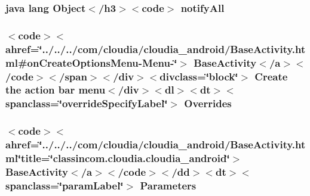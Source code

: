 \hypertarget{_sensor_overview_activity_8html_a1279357e6e09e33e75b55eb05fdb6436}{
\subsubsection[{notify\-All}]{\setlength{\rightskip}{0pt plus 5cm}java lang Object$<$/h3$>$$<$code$>$ notify\-All}}\label{_sensor_overview_activity_8html_a1279357e6e09e33e75b55eb05fdb6436}
\hypertarget{_sensor_overview_activity_8html_aed76f90ed460c58c4a3ab820f77c466f}{
\subsubsection[{Overrides}]{\setlength{\rightskip}{0pt plus 5cm}$<$code$>$$<$ahref=\char`\"{}../../../com/cloudia/cloudia\-\_\-android/Base\-Activity.\-html\#{\bf on\-Create\-Options\-Menu}-\/Menu-\/\char`\"{}$>$ Base\-Activity$<$/{\bf a}$>$$<$/code$>$$<$/{\bf span}$>$$<$/div$>$$<$divclass=\char`\"{}block\char`\"{}$>$ Create the action bar {\bf menu}$<$/div$>$$<$dl$>$$<${\bf dt}$>$$<$spanclass=\char`\"{}override\-Specify\-Label\char`\"{}$>$ Overrides}}\label{_sensor_overview_activity_8html_aed76f90ed460c58c4a3ab820f77c466f}
\hypertarget{_sensor_overview_activity_8html_a4eb7712dd2f8cbf746bedba580f47f4d}{
\subsubsection[{Parameters}]{\setlength{\rightskip}{0pt plus 5cm}$<$code$>$$<$ahref=\char`\"{}../../../com/cloudia/cloudia\-\_\-android/Base\-Activity.\-html\char`\"{}title=\char`\"{}classincom.\-cloudia.\-cloudia\-\_\-android\char`\"{}$>$ Base\-Activity$<$/{\bf a}$>$$<$/code$>$$<$/{\bf dd}$>$$<${\bf dt}$>$$<$spanclass=\char`\"{}param\-Label\char`\"{}$>$ Parameters}}\label{_sensor_overview_activity_8html_a4eb7712dd2f8cbf746bedba580f47f4d}
